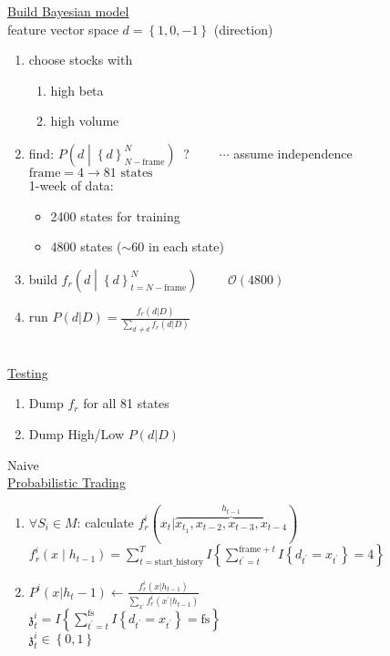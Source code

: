 \underline{Build Bayesian model} \\

feature vector space $d=\left\{ 1, 0, -1 \right\}$ (direction) 
\begin{enumerate}[label=\arabic*)]
\item choose stocks with 
\begin{enumerate}[label=\alph*)]
\item high beta
\item high volume
\end{enumerate}
\item find: $P\left(  d \middle| \left\{ d \right\}^{N}_{N-\text{frame}} \right)$ $\:$? $\qquad\cdots$ assume independence\\
$\text{frame}=4\rightarrow 81\text{\ states}$\\
1-week of data:
\begin{itemize}[label={\ }]
\item 2400 states for training
\item 4800 states ($\sim 60$ in each state)
\end{itemize}
\item build $f_r\left( d \middle| \left\{ d \right\}_{t=N-\text{frame}}^{N}\right)$ $\qquad\mathcal{O}(4800)$
\item run $P( d | D )=\frac{f_r( d | D )}{\sum_{d^\prime \neq d} f_r( d | D )}$
\end{enumerate}
{\ }\\

\underline{Testing}\\

\begin{enumerate}[label=\alph*)]
\item Dump $f_r$ for all 81 states
\item Dump High/Low $P( d | D )$
\end{enumerate}

\newpage

Naive\\
\underline{Probabilistic Trading}\\

\begin{enumerate}[label=\arabic*)]
\item $\forall S_i \in M$: calculate $f^{i}_{r}( x_t | \overbrace{x_{t_1}, x_{t-2}, x_{t-3}, x_{t-4}}^{h_{t-1}} )$ \\
$
f^{i}_{r}\left( x \middle| h_{t-1} \right)
= \sum_{t=\text{start\_history}}^{T}
 I \left\{ \sum_{t^\prime=t}^{{\text{frame}}+t} I \left\{ d_{t^\prime} = x_{t^\prime} \right\} = 4 \right\}
$
\item $P^{i}(x|h_t-1)\leftarrow \frac{f^{i}_{r}( x | h_{t-1} )}{\sum_{x^\prime} f^{i}_{r}( x^\prime | h_{t-1} )}$ \\
$\mathfrak{z}^{i}_{t}=I\left\{ \sum_{t^\prime=t}^{\text{fs}} I\left\{ d_{t^\prime} = x_{t^\prime} \right\} = \text{fs} \right\}$ \\
$\mathfrak{z}^{i}_{t} \in \left\{ 0, 1 \right\}$
\end{enumerate}



